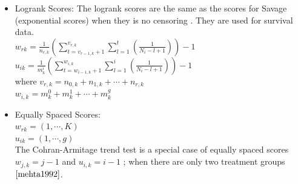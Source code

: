 \documentclass[12pt,oneside]{report}
\theoremstyle{definition}
\theoremstyle{mystyle}
\begin{document}
\begin{itemize}
	
	
	
	
	
	\item Logrank Scores: The logrank scores are the same as  the scores for Savage (exponential scores) when they is no censoring \cite{mehta1992}. They are used for survival data.\\
	$w_{rk}=\frac{1}{n_{r,k}}\left(\sum\limits_{t=v_{r-1,k}+1}^{v_{r,k}}\sum\limits_{l=1}^{t} \left(\frac{1}{N_{i}-l+1}  \right)   \right)-1$\\
	$u_{ik}=\frac{1}{m_{k}^{i}}\left(\sum\limits_{t=w_{i-1,k}+1}^{w_{i,k}}\sum\limits_{l=1}^{i} \left(\frac{1}{N_{i}-l+1}  \right)   \right)-1$\\
	
	where $v_{r,k}=n_{0,k}+n_{1,k}+\cdots + n_{r,k} $\\
	$w_{i,k}=m_{k}^{0}+m_{k}^{1}+\cdots + m_{k}^{g}$\\
	
	\item Equally Spaced Scores:\\
	$w_{rk}=(1,\cdots,K)$\\
	$u_{ik}=(1,\cdots,g)$\\
	The Cohran-Armitage trend test is a special case of  equally spaced scores $w_{j,k}=j-1$ and $u_{i,k}=i-1$ ; when there are only two treatment groups $\cite{mehta1992}$.
	
	
\end{itemize}
\end{document}
